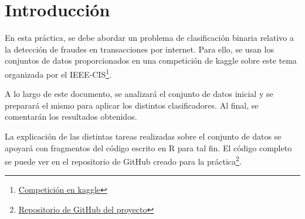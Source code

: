 \section{Introducción}
En esta práctica, se debe abordar un problema de clasificación binaria relativo
a la detección de fraudes en transacciones por internet. Para ello, se usan los
conjuntos de datos proporcionados en una competición de kaggle sobre este tema
organizada por el
IEEE-CIS\footnote{\href{https://www.kaggle.com/c/ieee-fraud-detection/}{Competición
en kaggle}}.

A lo largo de este documento, se analizará el conjunto de datos inicial y se
preparará el mismo para aplicar los distintos clasificadores. Al final, se
comentarán los resultados obtenidos.

La explicación de las distintas tareas realizadas sobre el conjunto de datos se
apoyará con fragmentos del código escrito en R para tal fin. El código completo
se puede ver en el repositorio de GitHub creado para la
práctica\footnote{\href{https://github.com/Varrrro/fraud-detection}{Repositorio
de GitHub del proyecto}}.

